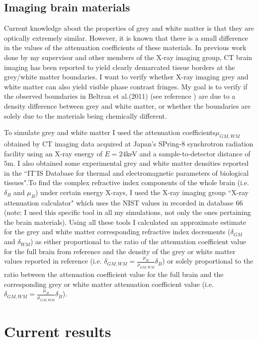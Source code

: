 \documentclass[9pt, a4paper]{article}
\begin{document}
\subsection{Imaging brain materials}
Current knowledge about the properties of grey and white matter is that they are optically extremely similar. However, it is known that there is a small difference in the values of the attenuation coefficients of these materials. In previous work done by my supervisor and other members of the X-ray imaging group, CT brain imaging has been reported to yield clearly demarcated tissue borders at the grey/white matter boundaries\cite{Beltran2}. I want to verify whether X-ray imaging grey and white matter can also yield visible phase contrast fringes. My goal is to verify if the observed boundaries in Beltran et al.(2011) (see reference \cite{Beltran2}) are due to a density difference between grey and white matter, or whether the boundaries are solely due to the materials being chemically different.

To simulate grey and white matter I used the attenuation coefficients${\mu_{GM,WM}}$ obtained by CT imaging data acquired at Japan's SPring-8 synchrotron radiation facility using an X-ray energy of $E = 24$keV and a sample-to-detector distance of $5$m\cite{Linda}. I also obtained some experimental grey and white matter densities reported in the ``IT’IS Database for thermal and electromagnetic parameters of biological tissues".To find the complex refractive index components of the whole brain (i.e. $\delta_B$ and $\mu_B$) under certain energy X-rays, I used the X-ray imaging group ``X-ray attenuation calculator" which uses the NIST values in recorded in database 66\cite{NIST} (note: I used this specific tool in all my simulations, not only the ones pertaining the brain materials). 
Using all these tools I calculated an approximate estimate for the grey and white matter corresponding refractive index decrements ($\delta_{GM}$ and $\delta_{WM}$) as either proportional to the ratio of the attenuation coefficient value for the full brain from reference\cite{NIST} and the density of the grey or white matter values reported in reference \cite{ITIS} (i.e. $\delta_{GM,WM} = \frac{\mu_B}{\rho_{GM,WM}} \delta_B$) or solely proportional to the ratio between the attenuation coefficient value for the full brain and the corresponding grey or white matter attenuation coefficient value (i.e. $\delta_{GM,WM} = \frac{\mu_B}{\mu_{GM,WM}} \delta_B$). 

\section{Current results}
\end{document}
